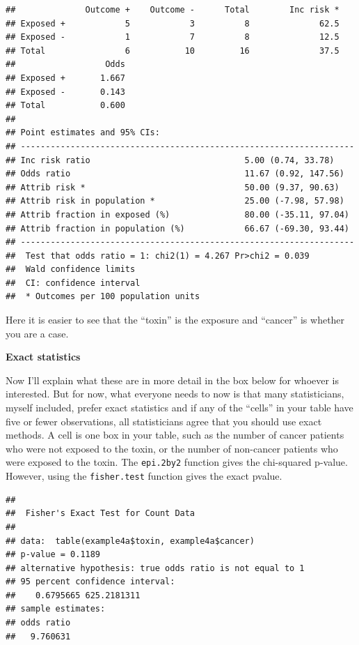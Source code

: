 \documentclass[]{book}
\newenvironment{Shaded}{\begin{snugshade}}{\end{snugshade}}
\newcommand{\KeywordTok}[1]{\textcolor[rgb]{0.13,0.29,0.53}{\textbf{#1}}}
\newcommand{\NormalTok}[1]{#1}
\newcommand{\OperatorTok}[1]{\textcolor[rgb]{0.81,0.36,0.00}{\textbf{#1}}}
\begin{document}
\begin{verbatim}
##              Outcome +    Outcome -      Total        Inc risk *
## Exposed +            5            3          8              62.5
## Exposed -            1            7          8              12.5
## Total                6           10         16              37.5
##                  Odds
## Exposed +       1.667
## Exposed -       0.143
## Total           0.600
## 
## Point estimates and 95% CIs:
## -------------------------------------------------------------------
## Inc risk ratio                               5.00 (0.74, 33.78)
## Odds ratio                                   11.67 (0.92, 147.56)
## Attrib risk *                                50.00 (9.37, 90.63)
## Attrib risk in population *                  25.00 (-7.98, 57.98)
## Attrib fraction in exposed (%)               80.00 (-35.11, 97.04)
## Attrib fraction in population (%)            66.67 (-69.30, 93.44)
## -------------------------------------------------------------------
##  Test that odds ratio = 1: chi2(1) = 4.267 Pr>chi2 = 0.039
##  Wald confidence limits
##  CI: confidence interval
##  * Outcomes per 100 population units
\end{verbatim}

Here it is easier to see that the ``toxin'' is the exposure and ``cancer'' is whether you are a case.

\textbf{Exact statistics}

Now I'll explain what these are in more detail in the box below for whoever is interested. But for now, what everyone needs to now is that many statisticians, myself included, prefer exact statistics and if any of the ``cells'' in your table have five or fewer observations, all statisticians agree that you should use exact methods. A cell is one box in your table, such as the number of cancer patients who were not exposed to the toxin, or the number of non-cancer patients who were exposed to the toxin. The \texttt{epi.2by2} function gives the chi-squared p-value. However, using the \texttt{fisher.test} function gives the exact pvalue.

\begin{Shaded}
\end{Shaded}

\begin{verbatim}
## 
##  Fisher's Exact Test for Count Data
## 
## data:  table(example4a$toxin, example4a$cancer)
## p-value = 0.1189
## alternative hypothesis: true odds ratio is not equal to 1
## 95 percent confidence interval:
##    0.6795665 625.2181311
## sample estimates:
## odds ratio 
##   9.760631
\end{verbatim}
\end{document}
